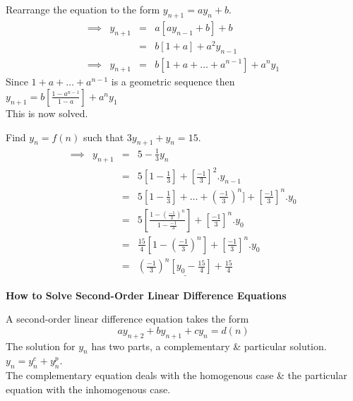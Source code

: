 \documentclass[11pt,a4paper]{article}
\begin{document}
\subtitle{Process}
Rearrange the equation to the form $y_{n+1} = ay_n + b$.\\
\[\begin{array}{rrcl}
\implies& y_{n+1} &=& a[ay_{n-1} + b] + b\\
&&=& b[1 + a] + a^2y_{n-1}\\
\implies& y_{n+1} &=& b[1 + a + \dots + a^{n-1}] + a^ny_1
\end{array}\]
Since $1 + a + \dots + a^{n-1}$ is a geometric sequence then\\
\-\hspace{4ex}$y_{n+1} = b\left[\frac{1-a^{n-1}}{1-a}\right] + a^ny_1$\\
This is now solved.\\

\subtitle{Example}
Find $y_n = f(n)$ such that $3y_{n+1} + y_n = 15$.
\[\begin{array}{rrcl}
\implies& y_{n+1} &=& 5 - \frac{1}{3}y_n\\
&&=& 5\left[1 - \frac{1}{3}\right] + \left[\frac{-1}{3}\right]^2.y_{n-1}\\
&&=& 5\left[1 - \frac{1}{3}\right] + \dots + \left(\frac{-1}{3}\right)^n] + \left[\frac{-1}{3}\right]^n.y_0\\
&&=& 5\left[\frac{1-\left(\frac{-1}{3}\right)^n}{1-\frac{-1}{3}}\right] + \left[\frac{-1}{3}\right]^n.y_0\\
&&=& \frac{15}{4}\left[1 - \left(\frac{-1}{3}\right)^n\right] + \left[\frac{-1}{3}\right]^n.y_0\\
&&=& \underline{\left(\frac{-1}{3}\right)^n\left[y_0 - \frac{15}{4}\right] + \frac{15}{4}}
\end{array}\]

\textbf{How to Solve Second-Order Linear Difference Equations}\\

\subtitle{Theory}
A second-order linear difference equation takes the form
$$ay_{n+2} + by_{n+1} + cy_n = d(n)$$
The solution for $y_n$ has two parts, a complementary \& particular solution. $y_n = y_n^c + y_n^p$.\\
The complementary equation deals with the homogenous case \& the particular equation with the inhomogenous case.\\
\end{document}
